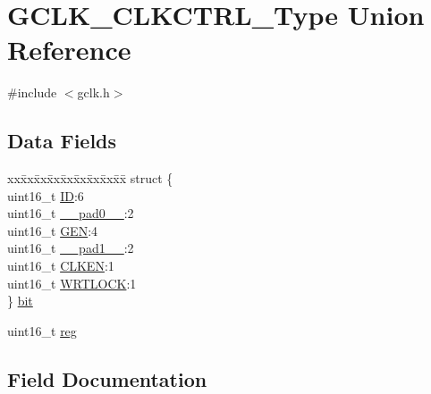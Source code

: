 \hypertarget{union_g_c_l_k___c_l_k_c_t_r_l___type}{}\section{G\+C\+L\+K\+\_\+\+C\+L\+K\+C\+T\+R\+L\+\_\+\+Type Union Reference}
\label{union_g_c_l_k___c_l_k_c_t_r_l___type}


{\ttfamily \#include $<$gclk.\+h$>$}

\subsection*{Data Fields}
\begin{DoxyCompactItemize}
\item 
\begin{tabbing}
xx\=xx\=xx\=xx\=xx\=xx\=xx\=xx\=xx\=\kill
struct \{\\
\>uint16\_t \mbox{\hyperlink{union_g_c_l_k___c_l_k_c_t_r_l___type_a9bb81603329def43dbb55e1ae69996d9}{ID}}:6\\
\>uint16\_t \mbox{\hyperlink{union_g_c_l_k___c_l_k_c_t_r_l___type_a77132c2c26a75f5b8751b235cda23828}{\_\_pad0\_\_}}:2\\
\>uint16\_t \mbox{\hyperlink{union_g_c_l_k___c_l_k_c_t_r_l___type_a78713187f96712c67640c9203c167fb8}{GEN}}:4\\
\>uint16\_t \mbox{\hyperlink{union_g_c_l_k___c_l_k_c_t_r_l___type_ab72e3a1f2f7db8695c60c658f5a0f11a}{\_\_pad1\_\_}}:2\\
\>uint16\_t \mbox{\hyperlink{union_g_c_l_k___c_l_k_c_t_r_l___type_a69cbf0aa57cb4af25ece541f0d949c07}{CLKEN}}:1\\
\>uint16\_t \mbox{\hyperlink{union_g_c_l_k___c_l_k_c_t_r_l___type_a356c7cc083fb5e02d9093189453a3e23}{WRTLOCK}}:1\\
\} \mbox{\hyperlink{union_g_c_l_k___c_l_k_c_t_r_l___type_af51edbc61685bbd6836e18f82502e99d}{bit}}\\

\end{tabbing}\item 
uint16\+\_\+t \mbox{\hyperlink{union_g_c_l_k___c_l_k_c_t_r_l___type_a11760f5020019f4aa8cb02e694f7cc44}{reg}}
\end{DoxyCompactItemize}


\subsection{Field Documentation}
\mbox{\label{union_g_c_l_k___c_l_k_c_t_r_l___type_a77132c2c26a75f5b8751b235cda23828}} 
